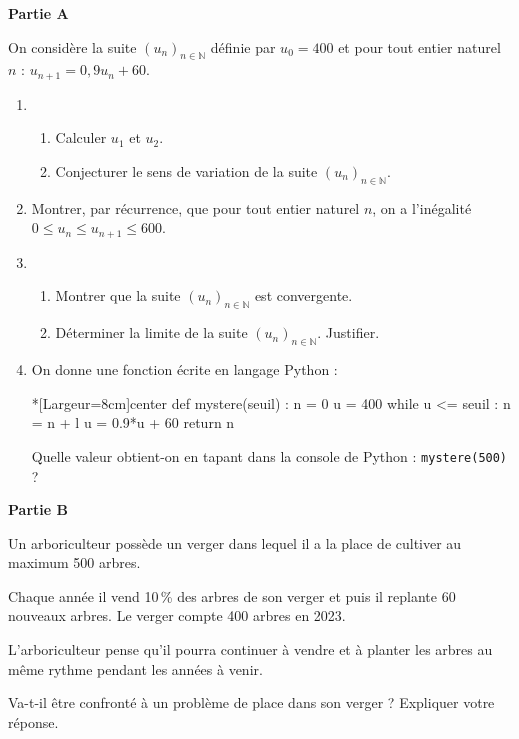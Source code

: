 \textbf{Partie A}

\medskip

On considère la suite $\left(u_n\right)_{n \in \mathbb{N}}$ définie par $u_0 = 400$ et pour tout entier naturel $n$ : $u_{n+1} = 0,9u_n + 60$.

\begin{enumerate}
	\item 
	\begin{enumerate}
		\item Calculer $u_1$ et $u_2$.
		\item Conjecturer le sens de variation de la suite $\left(u_n\right)_{n \in \mathbb{N}}$.
	\end{enumerate}
	\item Montrer, par récurrence, que pour tout entier naturel $n$, on a l'inégalité $0 \leqslant u_n \leqslant u_{n+1} \leqslant 600$.
	\item 
	\begin{enumerate}
		\item Montrer que la suite $\left(u_n\right)_{n \in \mathbb{N}}$ est convergente.
		\item Déterminer la limite de la suite $\left(u_n\right)_{n \in \mathbb{N}}$. Justifier.
	\end{enumerate}
	\item On donne une fonction écrite en langage \textsf{Python} :

\begin{CodePythonLstAlt}*[Largeur=8cm]{center}
def mystere(seuil) :
	n = 0
	u = 400
	while u <= seuil :
		n = n + l
		u = 0.9*u + 60
	return n
\end{CodePythonLstAlt}
	Quelle valeur obtient-on en tapant dans la console de \textsf{Python} : \texttt{mystere(500)} ?
\end{enumerate}

\medskip

\textbf{Partie B}

\medskip

Un arboriculteur possède un verger dans lequel il a la place de cultiver au maximum 500 arbres.

Chaque année il vend 10\,\% des arbres de son verger et puis il replante 60 nouveaux arbres. Le verger compte 400 arbres en 2023.

\smallskip

L'arboriculteur pense qu'il pourra continuer à vendre et à planter les arbres au même rythme pendant les années à venir.

\medskip

Va-t-il être confronté à un problème de place dans son verger ? Expliquer votre réponse.